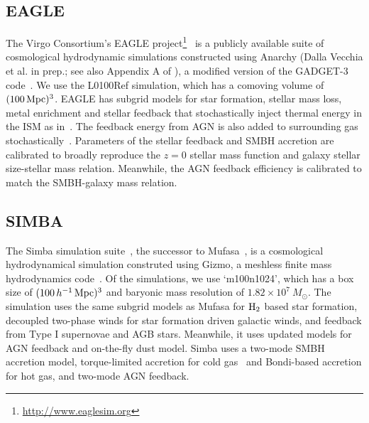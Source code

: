 \subsection{EAGLE} \label{sec:eagle} 
The Virgo Consortium's EAGLE
project\footnote{\url{http://www.eaglesim.org}}~\citep{schaye2015, crain2015,
mcalpine2016} is a publicly available suite of cosmological hydrodynamic
simulations constructed using {\sc Anarchy} (Dalla Vecchia et al. in prep.; 
see also Appendix A of \citealt{schaye2015}), a modified version of the 
{\sc GADGET-3} code~\citep{springel2005}. We use the L0100Ref simulation,
which has a comoving volume of $(100\,{\rm Mpc})^3$. %
EAGLE has subgrid models for star formation, stellar mass loss, metal enrichment
and stellar feedback that stochastically inject thermal energy in the ISM as
in~\citep{dallavecchia2012}. The feedback energy from AGN is also added to
surrounding gas stochastically~\citep{booth2009}. Parameters of the stellar 
feedback and SMBH accretion are calibrated to broadly reproduce the $z=0$ 
stellar mass function and galaxy stellar size-stellar mass relation. Meanwhile, 
the AGN feedback efficiency is calibrated to match the SMBH-galaxy mass relation. 

\subsection{SIMBA} \label{sec:simba}
The {\sc Simba} simulation suite~\citep{dave2019}, the successor to {\sc
Mufasa}~\citep{dave2016, dave2017, dave2017a}, is a cosmological hydrodynamical
simulation construted using {\sc Gizmo}, a meshless finite mass hydrodynamics 
code~\citep{hopkins2015, hopkins2017}. Of the simulations, we use
`m100n1024', which has a box size of $(100\,h^{-1}\,{\rm Mpc})^3$ and baryonic 
mass resolution of $1.82 \times 10^7\ M_\odot$. The simulation uses the same
subgrid models as {\sc Mufasa} for $\rm H_2$ based star formation, decoupled
two-phase winds for star formation driven galactic winds, and feedback from 
Type I supernovae and AGB stars. Meanwhile, it uses updated models for AGN
feedback and on-the-fly dust model. {\sc Simba} uses a two-mode SMBH accretion 
model, torque-limited accretion for cold gas~\citep{angles-alcazar2017} and 
Bondi-based accretion for hot gas, and two-mode AGN feedback. %

